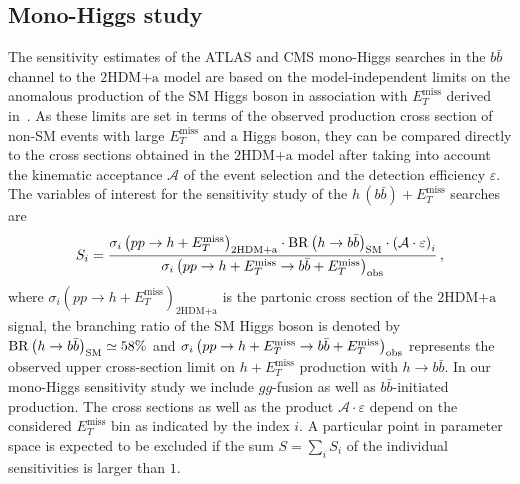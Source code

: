 \documentclass[a4paper, 11pt,notoc]{article}
\newcommand{\MET}{\ensuremath{E_T^\mathrm{miss}}\xspace}
\newcommand{\met}{\MET}
\newcommand{\hdma}{\ensuremath{\textrm{2HDM+a}}\xspace}
\begin{document}
\subsection{Mono-Higgs study}
\label{sec:sensi_monohbb}

The sensitivity estimates of the ATLAS and CMS mono-Higgs searches in the $b \bar b$ channel to the \hdma model are based on the model-independent limits on the anomalous production of the SM Higgs boson in association with \met derived in~\cite{Aaboud:2017yqz}.  As these limits are set in terms of the observed production cross section of non-SM events with large $\MET$ and a Higgs boson, they can be compared directly to the cross sections obtained in the \hdma model after taking into account the kinematic acceptance $\mathcal{A}$ of the event selection and the detection efficiency $\varepsilon$. The variables of interest for the sensitivity study of the $h \, (b \bar b) + \MET$ searches are
\begin{equation}
\label{eq:monoHbb_sensi}
S_i = \frac{\sigma_{i} \left ( p p \to h + \MET \right)_{\hdma} \cdot {\rm BR} \left (h \to b \bar b \right )_{\rm SM} \cdot \left ( \mathcal{A} \cdot \varepsilon \right)_i}
{\sigma_{i} \left ( p p \to h + \MET \to b \bar b + \MET \right)_{\rm obs}}\,,
\end{equation}
where $\sigma_{i} \left ( p p \to h + \MET \right)_{\hdma}$ is the partonic cross section of the \hdma signal,  the branching ratio of the SM Higgs boson is denoted by ${\rm BR} \left (h \to b \bar b \right )_{\rm SM} \simeq 58\%$  and $\sigma_{i} \left ( p p \to h + \MET \to b \bar b + \MET \right)_{\rm obs}$ represents the  observed upper cross-section limit on $h + \MET$ production with $h \to b \bar b$. In our mono-Higgs sensitivity study we include $gg$-fusion as well as $b \bar b$-initiated production.  The cross sections as well as the product $ \mathcal{A} \cdot \varepsilon$ depend on the considered $\MET$ bin as indicated by the index $i$.   A particular point in parameter space is expected to be excluded if the sum $S = \sum_i S_i$ of the individual sensitivities is larger than $1$.
\end{document}
